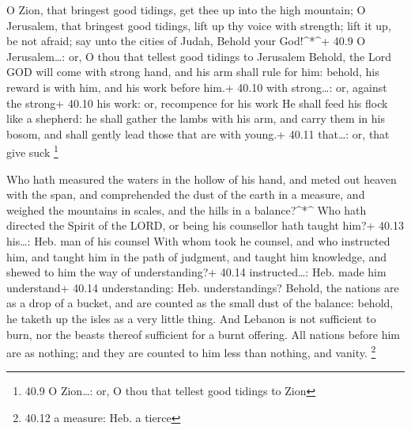  O Zion, that bringest good tidings, get thee up into the
high mountain; O Jerusalem, that bringest good tidings, lift up thy
voice with strength; lift it up, be not afraid; say unto the cities of
Judah, Behold your God!\^{}*\^{}+ 40.9 O Jerusalem\ldots: or, O thou
that tellest good tidings to Jerusalem  Behold, the Lord
GOD will come with strong hand, and his arm shall rule for him: behold,
his reward is with him, and his work before him.+ 40.10 with
strong\ldots: or, against the strong+ 40.10 his work: or, recompence for
his work  He shall feed his flock like a shepherd: he shall
gather the lambs with his arm, and carry them in his bosom, and shall
gently lead those that are with young.+ 40.11 that\ldots: or, that give
suck \footnote{40.9 O Zion\ldots: or, O thou that tellest good tidings
  to Zion}

 Who hath measured the waters in the hollow of his hand,
and meted out heaven with the span, and comprehended the dust of the
earth in a measure, and weighed the mountains in scales, and the hills
in a balance?\^{}*\^{}  Who hath directed the Spirit of the
LORD, or being his counsellor hath taught him?+ 40.13 his\ldots: Heb.
man of his counsel  With whom took he counsel, and who
instructed him, and taught him in the path of judgment, and taught him
knowledge, and shewed to him the way of understanding?+ 40.14
instructed\ldots: Heb. made him understand+ 40.14 understanding: Heb.
understandings?  Behold, the nations are as a drop of a
bucket, and are counted as the small dust of the balance: behold, he
taketh up the isles as a very little thing.  And Lebanon is
not sufficient to burn, nor the beasts thereof sufficient for a burnt
offering.  All nations before him are as nothing; and they
are counted to him less than nothing, and vanity. \footnote{40.12 a
  measure: Heb. a tierce}

